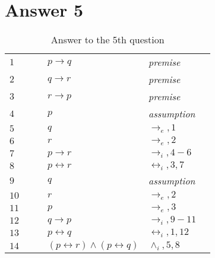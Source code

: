 \documentclass[12pt]{article}
\begin{document}
\section*{Answer 5}
\begin{table}[H]
	\centering
	\caption{Answer to the 5th question }
	\begin{tabular}{*6{l}}
		$1$ & & & $p \to q$ & \textit{premise} & \\
		$2$ & & & $q \to r$ & \textit{premise} & \\

		$3$ & & & $r \to p$ &\textit{premise} &\\

		\hline

		$4$ & & & $p$ & \textit{assumption} &\\

		$5$ & & & $q$ & $\rightarrow_e,1$ &\\

		$6$ & & & $r$ & $\rightarrow_e,2$ &\\

		\hline

		$7$ & & & $p \to r$ & $\rightarrow_i,4-6$ &\\


		$8$ & & & $p \leftrightarrow r$ & $\leftrightarrow_i,3,7$ &\\

		\hline

		$9$ & & & $q$ & \textit{assumption} &\\

		$10$ & & & $r$ & $\rightarrow_e,2$ &\\

		$11$ & & & $p$ & $\rightarrow_e,3$ &\\

		\hline

		$12$ & & & $q \to p$ & $\rightarrow_i,9-11$ &\\

		$13$ & & & $p \leftrightarrow q$ &$\leftrightarrow_i,1,12$ &\\

		$14$ & & & $(p \leftrightarrow r) \land (p \leftrightarrow q)$ & $\land_i,5,8$ &\\




	\end{tabular}
\end{table}
\end{document}
